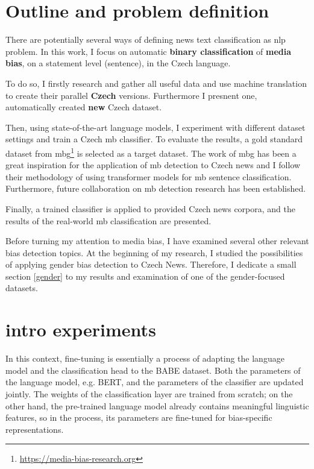 \section{Outline and problem definition}
There are potentially several ways of defining news text classification as \gls{nlp} problem.
In this work, I focus on automatic \textbf{binary classification} of \textbf{media bias}, on a statement level (sentence), in the Czech language.

To do so, I firstly research and gather all useful data and use machine translation to create their parallel \textbf{Czech} versions. Furthermore I presnent one, automatically created \textbf{new} Czech dataset. 

Then, using state-of-the-art language models, I experiment with different dataset settings and train a Czech \gls{mb} classifier. To evaluate the results, a gold standard dataset from \gls{mbg}\footnote{\url{https://media-bias-research.org}} is selected as a target dataset. The work of \gls{mbg} has been a great inspiration for the application of \gls{mb} detection to Czech news and I follow their methodology of using transformer models for \gls{mb} sentence classification. Furthermore, future collaboration on \gls{mb} detection research has been established.

Finally, a trained classifier is applied to provided Czech news corpora, and the results of the real-world \gls{mb} classification are presented.

Before turning my attention to media bias, I have examined several other relevant bias detection topics. At the beginning of my research, I studied the possibilities of applying gender bias detection to Czech News. Therefore, I dedicate a small section \ref{gender} to my results and examination of one of the gender-focused datasets.


\section{intro experiments}
In this context, fine-tuning is essentially a process of adapting the language
model and the classification head to the BABE dataset. Both the parameters
of the language model, e.g. BERT, and the parameters of the classifier are
updated jointly. The weights of the classification layer are trained from
scratch; on the other hand, the pre-trained language model already contains
meaningful linguistic features, so in the process, its parameters are fine-tuned
for bias-specific representations. 

